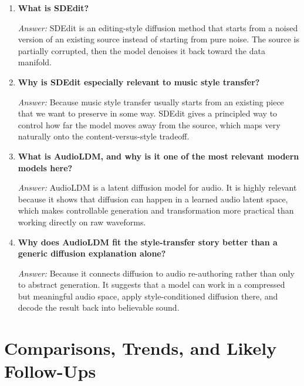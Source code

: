 \documentclass[11pt]{article}
\newcommand{\qa}[2]{
\item \textbf{#1}

\textit{Answer:} #2
}
\begin{document}
\begin{enumerate}[start=38]
\qa{What is SDEdit?}{
SDEdit is an editing-style diffusion method that starts from a noised version of an existing source instead of starting from pure noise. The source is partially corrupted, then the model denoises it back toward the data manifold.
}

\qa{Why is SDEdit especially relevant to music style transfer?}{
Because music style transfer usually starts from an existing piece that we want to preserve in some way. SDEdit gives a principled way to control how far the model moves away from the source, which maps very naturally onto the content-versus-style tradeoff.
}

\qa{What is AudioLDM, and why is it one of the most relevant modern models here?}{
AudioLDM is a latent diffusion model for audio. It is highly relevant because it shows that diffusion can happen in a learned audio latent space, which makes controllable generation and transformation more practical than working directly on raw waveforms.
}

\qa{Why does AudioLDM fit the style-transfer story better than a generic diffusion explanation alone?}{
Because it connects diffusion to audio re-authoring rather than only to abstract generation. It suggests that a model can work in a compressed but meaningful audio space, apply style-conditioned diffusion there, and decode the result back into believable sound.
}
\end{enumerate}

\section{Comparisons, Trends, and Likely Follow-Ups}
\end{document}
